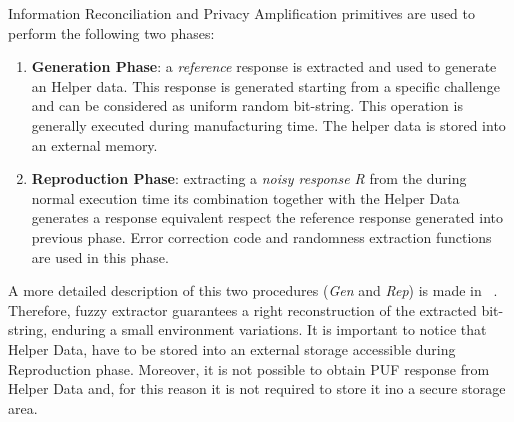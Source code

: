 \documentclass[../tesi.tex]{subfiles}
\begin{document}
Information Reconciliation and Privacy Amplification primitives are used to perform the following two phases:
\begin{enumerate}
\item \textbf{Generation Phase}: a \emph{reference} \puf{} response is extracted and used to generate an Helper data.  This response is generated starting from a specific challenge and can be considered as uniform random bit-string. This operation is generally executed during manufacturing time. The helper data is stored into an external memory. 
\item \textbf{Reproduction Phase}:  extracting a \emph{noisy response R} from the \puf{} during normal execution time its combination together with the Helper Data generates a   response equivalent respect the reference response generated into previous phase. Error correction code and randomness extraction functions are used in this phase. 
\end{enumerate}
A more detailed description of this two procedures (\emph{Gen} and \emph{Rep}) is made in ~\cite{guajardo2009anti}. Therefore, fuzzy extractor guarantees a right reconstruction of the extracted bit-string, enduring a small environment variations. 
It is important to notice that Helper Data, have to be stored into an external storage accessible during Reproduction phase. Moreover, it is not possible to obtain PUF response from Helper Data and, for this reason it is not required to store it ino a secure storage area. 
\end{document}
